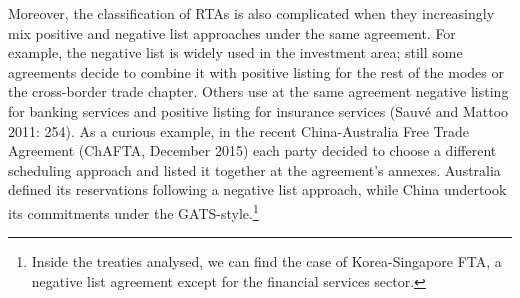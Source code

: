 \documentclass{article}
\begin{document}
\smallskip

Moreover, the classification of RTAs is also complicated when they increasingly mix positive and negative list approaches under the same agreement. For example, the negative list is widely used in the investment area; still some agreements decide to combine it with positive listing for the rest of the modes or the cross-border trade chapter. Others use at the same agreement negative listing for banking services and positive listing for insurance services (Sauvé and Mattoo 2011: 254). As a curious example, in the recent China-Australia Free Trade Agreement (ChAFTA, December 2015) each party decided to choose a different scheduling approach and listed it together at the agreement’s annexes. Australia defined its reservations following a negative list approach, while China undertook its commitments under the GATS-style.\footnote{Inside the treaties analysed, we can find the case of Korea-Singapore FTA, a negative list agreement except for the financial services sector.}

\smallskip
\end{document}
